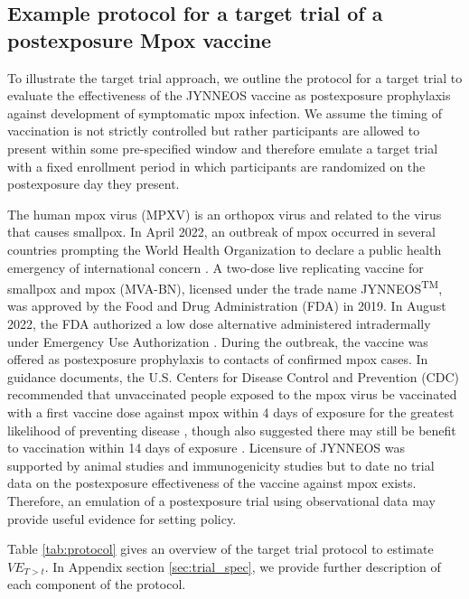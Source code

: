 \documentclass[11pt]{article}
\begin{document}
\subsection{Example protocol for a target trial of a postexposure Mpox vaccine}

To illustrate the target trial approach, we outline the protocol for a target trial to evaluate the effectiveness of the JYNNEOS vaccine as postexposure prophylaxis against development of symptomatic mpox infection. We assume the timing of vaccination is not strictly controlled but rather participants are allowed to present within some pre-specified window and therefore emulate a target trial with a fixed enrollment period in which participants are randomized on the postexposure day they present.

The human mpox virus (MPXV) is an orthopox virus and related to the virus that causes smallpox. In April 2022, an outbreak of mpox occurred in several countries prompting the World Health Organization to declare a public health emergency of international concern \cite{nuzzo_who_2022}. A two-dose live replicating vaccine for smallpox and mpox (MVA-BN), licensed under the trade name JYNNEOS\textsuperscript{TM}, was approved by the Food and Drug Administration (FDA) in 2019. In August 2022, the FDA authorized a low dose alternative administered intradermally under Emergency Use Authorization \cite{united_states_food_and_drug_administration_monkeypox_2022}. During the outbreak, the vaccine was offered as postexposure prophylaxis to contacts of confirmed mpox cases. In guidance documents, the U.S. Centers for Disease Control and Prevention (CDC) recommended that unvaccinated people exposed to the mpox virus be vaccinated with a first vaccine dose against mpox within 4 days of exposure for the greatest likelihood of preventing disease \cite{cdc_mpox_2023-1}, though also suggested there may still be benefit to vaccination within 14 days of exposure \cite{kecmanovic1975einfluss,sommer_1972_1974}. Licensure of JYNNEOS was supported by animal studies \cite{earl_rapid_2008,keckler_effects_2013,hatch_assessment_2013,samuelsson_survival_2008} and immunogenicity studies \cite{pittman_phase_2019} but to date no trial data on the postexposure effectiveness of the vaccine against mpox exists. Therefore, an emulation of a postexposure trial using observational data may provide useful evidence for setting policy.

Table \ref{tab:protocol} gives an overview of the target trial protocol to estimate $VE_{T>t}$. In Appendix section \ref{sec:trial_spec}, we provide further description of each component of the protocol.
\end{document}
